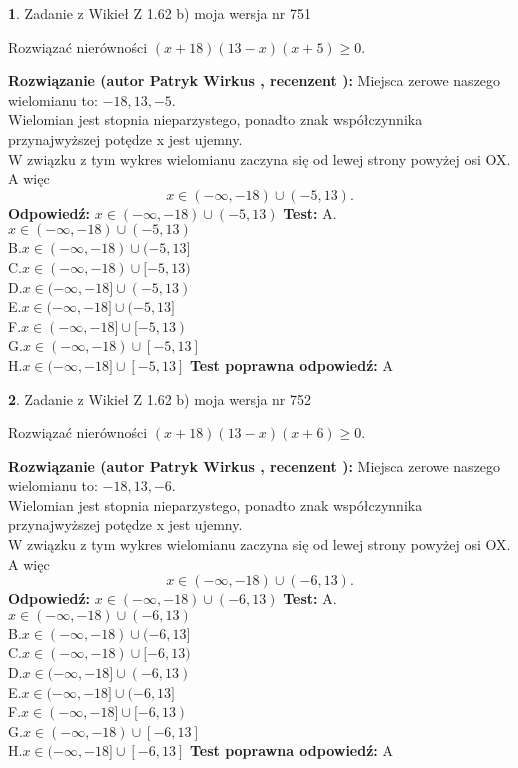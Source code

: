 \documentclass[12pt, a4paper]{article}
\theoremstyle{definition} %
\newtheorem{zad}{}
\newcommand{\zadStart}[1]{\begin{zad}#1\newline}
\newcommand{\zadStop}{\end{zad}}
\newcommand{\rozwStart}[2]{\noindent \textbf{Rozwiązanie (autor #1 , recenzent #2): }\newline}
\newcommand{\rozwStop}{\newline}
\newcommand{\odpStart}{\noindent \textbf{Odpowiedź:}\newline}
\newcommand{\odpStop}{\newline}
\newcommand{\testStart}{\noindent \textbf{Test:}\newline}
\newcommand{\testStop}{\newline}
\newcommand{\kluczStart}{\noindent \textbf{Test poprawna odpowiedź:}\newline}
\newcommand{\kluczStop}{\newline}
\begin{document}
\zadStart{Zadanie z Wikieł Z 1.62 b) moja wersja nr 751}

Rozwiązać nierówności $(x+18)(13-x)(x+5)\ge0$.
\zadStop
\rozwStart{Patryk Wirkus}{}
Miejsca zerowe naszego wielomianu to: $-18, 13, -5$.\\
Wielomian jest stopnia nieparzystego, ponadto znak współczynnika przy\linebreak najwyższej potędze x jest ujemny.\\ W związku z tym wykres wielomianu zaczyna się od lewej strony powyżej osi OX. A więc $$x \in (-\infty,-18) \cup (-5,13).$$
\rozwStop
\odpStart
$x \in (-\infty,-18) \cup (-5,13)$
\odpStop
\testStart
A.$x \in (-\infty,-18) \cup (-5,13)$\\
B.$x \in (-\infty,-18) \cup (-5,13]$\\
C.$x \in (-\infty,-18) \cup [-5,13)$\\
D.$x \in (-\infty,-18] \cup (-5,13)$\\
E.$x \in (-\infty,-18] \cup (-5,13]$\\
F.$x \in (-\infty,-18] \cup [-5,13)$\\
G.$x \in (-\infty,-18) \cup [-5,13]$\\
H.$x \in (-\infty,-18] \cup [-5,13]$
\testStop
\kluczStart
A
\kluczStop



\zadStart{Zadanie z Wikieł Z 1.62 b) moja wersja nr 752}

Rozwiązać nierówności $(x+18)(13-x)(x+6)\ge0$.
\zadStop
\rozwStart{Patryk Wirkus}{}
Miejsca zerowe naszego wielomianu to: $-18, 13, -6$.\\
Wielomian jest stopnia nieparzystego, ponadto znak współczynnika przy\linebreak najwyższej potędze x jest ujemny.\\ W związku z tym wykres wielomianu zaczyna się od lewej strony powyżej osi OX. A więc $$x \in (-\infty,-18) \cup (-6,13).$$
\rozwStop
\odpStart
$x \in (-\infty,-18) \cup (-6,13)$
\odpStop
\testStart
A.$x \in (-\infty,-18) \cup (-6,13)$\\
B.$x \in (-\infty,-18) \cup (-6,13]$\\
C.$x \in (-\infty,-18) \cup [-6,13)$\\
D.$x \in (-\infty,-18] \cup (-6,13)$\\
E.$x \in (-\infty,-18] \cup (-6,13]$\\
F.$x \in (-\infty,-18] \cup [-6,13)$\\
G.$x \in (-\infty,-18) \cup [-6,13]$\\
H.$x \in (-\infty,-18] \cup [-6,13]$
\testStop
\kluczStart
A
\kluczStop
\end{document}
